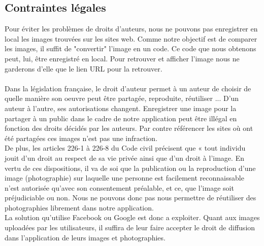 \documentclass[a4paper,12pt]{article}
\begin{document}
\subsection{Contraintes légales}
Pour éviter les problèmes de droits d'auteurs, nous ne pouvons pas enregistrer en local les images trouvées sur les sites web. Comme notre objectif est de comparer les images, il suffit de "convertir" l'image en un code. Ce code que nous obtenons peut, lui, être enregistré en local. Pour retrouver et afficher l'image nous ne garderons d'elle que le lien URL pour la retrouver. \\ \\
Dans la législation française, le droit d'auteur permet à un auteur de choisir de quelle manière son oeuvre peut être partagée, reproduite, réutiliser ... D'un auteur à l'autre, ses autorisations changent. Enregistrer une image pour la partager à un public dans le cadre de notre application peut être illégal en fonction des droits décidés par les auteurs. Par contre référencer les sites où ont été partagées ces images n'est pas une infraction. \\ 
De plus, les articles 226-1 à 226-8 du Code civil précisent que « tout individu jouit d’un droit au respect de sa vie privée ainsi que d’un droit à l’image. En vertu de ces dispositions, il va de soi que la publication ou la reproduction d’une image (photographie) sur laquelle une personne est facilement reconnaissable n’est autorisée qu’avec son consentement préalable, et ce, que l’image soit préjudiciable ou non. Nous ne pouvons donc pas nous permettre de réutiliser des photographies librement dans notre application. \\ 
La solution qu'utilise Facebook ou Google est donc a exploiter. Quant aux images uploadées par les utilisateurs, il suffira de leur faire accepter le droit de diffusion dans l'application de leurs images et photographies. 

\newpage
{}
\end{document}
